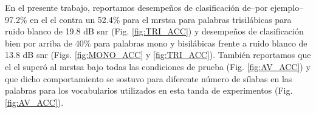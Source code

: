 
En el presente trabajo, reportamos desempeños de clasificación de--por ejemplo--97.2\% en el \gls{el} contra un 52.4\% para el \gls{mrstsa} para palabras trisilábicas para ruido blanco de 19.8 dB \gls{snr} (Fig. \ref{fig:TRI_ACC}) y desempeños de clasificación bien por arriba de 40\% para palabras mono y bisilábicas frente a ruido blanco de 13.8 dB \gls{snr} (Figs. \ref{fig:MONO_ACC} y \ref{fig:TRI_ACC}). También reportamos que el \gls{el} superó al \gls{mrstsa} bajo todas las condiciones de prueba (Fig. \ref{fig:AV_ACC})  y que dicho comportamiento se sostuvo para diferente número de sílabas en las palabras para los vocabularios utilizados en esta tanda de experimentos (Fig. \ref{fig:AV_ACC}).


